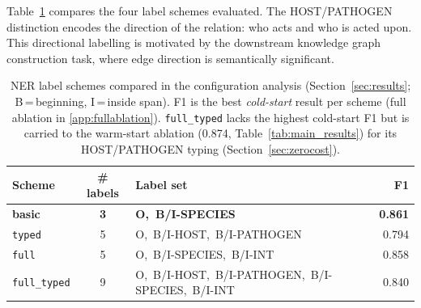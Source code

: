 \documentclass[a4paper,fleqn]{cas-sc}
\begin{document}
Table~\ref{tab:ner_schemes} compares the four label schemes evaluated.
The HOST/PATHOGEN distinction encodes the direction of the relation: who acts
and who is acted upon. This directional labelling is motivated by the downstream
knowledge graph construction task, where edge direction is semantically significant.

\begin{table}[!ht]
\centering
\small
\caption{NER label schemes compared in the configuration analysis
(Section~\ref{sec:results}; B\,=\,beginning, I\,=\,inside span).
F1 is the best \emph{cold-start} result per scheme (full ablation in
\ref{app:fullablation}). \texttt{full\_typed} lacks the highest
cold-start F1 but is carried to the warm-start ablation (0.874,
Table~\ref{tab:main_results}) for its HOST/PATHOGEN typing (Section~\ref{sec:zerocost}).}
\label{tab:ner_schemes}
\begin{tabular}{lclr}
\toprule
\textbf{Scheme} & \textbf{\# labels} & \textbf{Label set} & \textbf{F1} \\
\midrule
\textbf{basic}       & \textbf{3} & \textbf{O,\ B/I-SPECIES}                            & \textbf{0.861} \\
\texttt{typed}       & 5 & O,\ B/I-HOST,\ B/I-PATHOGEN                         & 0.794 \\
\texttt{full}        & 5 & O,\ B/I-SPECIES,\ B/I-INT                           & 0.858 \\
\texttt{full\_typed} & 9 & O,\ B/I-HOST,\ B/I-PATHOGEN,\ B/I-SPECIES,\ B/I-INT & 0.840 \\
\bottomrule
\end{tabular}
\end{table}
\end{document}
